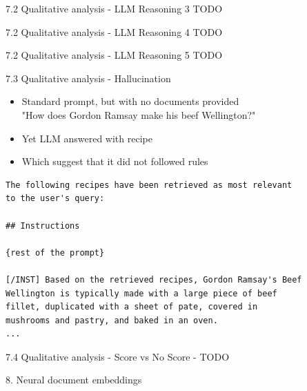 \documentclass{beamer}
\begin{document}
\begin{frame}{7.2 Qualitative analysis - LLM Reasoning 3}
  TODO
\end{frame}

\begin{frame}{7.2 Qualitative analysis - LLM Reasoning 4}
  TODO
\end{frame}

\begin{frame}{7.2 Qualitative analysis - LLM Reasoning 5}
  TODO
\end{frame}


\begin{frame}[fragile]{7.3 Qualitative analysis - Hallucination}
  \begin{itemize}
    \item Standard prompt, but with no documents provided \\
          "How does Gordon Ramsay make his beef Wellington?"
    \item Yet LLM answered with recipe
    \item Which suggest that it did not followed rules
  \end{itemize}
  \begin{verbatim}
The following recipes have been retrieved as most relevant
to the user's query:

## Instructions

{rest of the prompt}

[/INST] Based on the retrieved recipes, Gordon Ramsay's Beef
Wellington is typically made with a large piece of beef
fillet, duplicated with a sheet of pate, covered in
mushrooms and pastry, and baked in an oven.
...
  \end{verbatim}
\end{frame}

\begin{frame}{7.4 Qualitative analysis - Score vs No Score - TODO }
\end{frame}

\begin{frame}{8. Neural document embeddings}
\end{frame}
\end{document}
